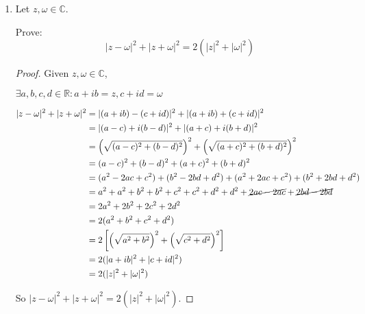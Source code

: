 \documentclass[12pt,letterpaper]{article}
\begin{document}
\begin{enumerate}
\begin{proof}
        Now let's multiply the first equation by $c$ and the second by $a$.
        \begin{alignat*}{3}
          acx_1 & {} + {} & bcx_2 & {} = {} & 0 \\
          acx_1 & {} + {} & adx_2 & {} = {} & 0
        \end{alignat*}

        Now let's subtract the first equation from the second.
        \begin{align*}
          (acx_1 + adx_2) - (acx_1 + bcx_2) &= 0 - 0 \\
          acx_1 - acx_1 + adx_2 - bcx_2 &= 0 \\
          adx_2 - bcx_2 &= 0 \\
          (ad - bc)x_2 &= 0
        \end{align*}

        Again, we assumed that $ad - bc \neq 0$ so we divide by $ad - bc$.
        \[x_2 = 0\]

        So $x_1 = x_2 = 0$.
        Thus if $ad - bc \neq 0$, then $x_1 = x_2 = 0$.

      \end{proof}

    \item
      Let $z, \omega \in \mathbb{C}$.

      Prove:
      \[|z - \omega|^2 + |z + \omega|^2 = 2(|z|^2 + |\omega|^2)\]

      \begin{proof}
        Given $z, \omega \in \mathbb{C}$,

        $\exists a, b, c, d \in \mathbb{R} : a + ib = z, c + id = \omega$

        \begin{align*}
          |z - \omega|^2 + |z + \omega|^2 &=
            |(a + ib) - (c + id)|^2 + |(a + ib) + (c + id)|^2 \\
          &= |(a - c) + i(b - d)|^2 + |(a + c) + i(b + d)|^2 \\
          &= \left(\sqrt{(a - c)^2 + (b - d)^2}\right)^2 +
            \left(\sqrt{(a + c)^2 + (b + d)^2}\right)^2 \\
          &= (a - c)^2 + (b - d)^2 + (a + c)^2 + (b + d)^2 \\
          &= (a^2 - 2ac + c^2) + (b^2 - 2bd + d^2) +
            (a^2 + 2ac + c^2) + (b^2 + 2bd + d^2) \\
          &= a^2 + a^2 + b^2 + b^2 + c^2 + c^2 + d^2 + d^2 +
            \cancel{2ac - 2ac} + \cancel{2bd - 2bd} \\
          &= 2a^2 + 2b^2 + 2c^2 + 2d^2 \\
          &= 2(a^2 + b^2 + c^2 + d^2) \\
          &= 2\left[\left(\sqrt{a^2 + b^2}\right)^2 + \left(\sqrt{c^2 + d^2}\right)^2\right] \\
          &= 2(|a + ib|^2 + |c + id|^2) \\
          &= 2(|z|^2 + |\omega|^2)
        \end{align*}

        So $|z - \omega|^2 + |z + \omega|^2 = 2(|z|^2 + |\omega|^2)$.
      \end{proof}
  \end{enumerate}
\end{document}

